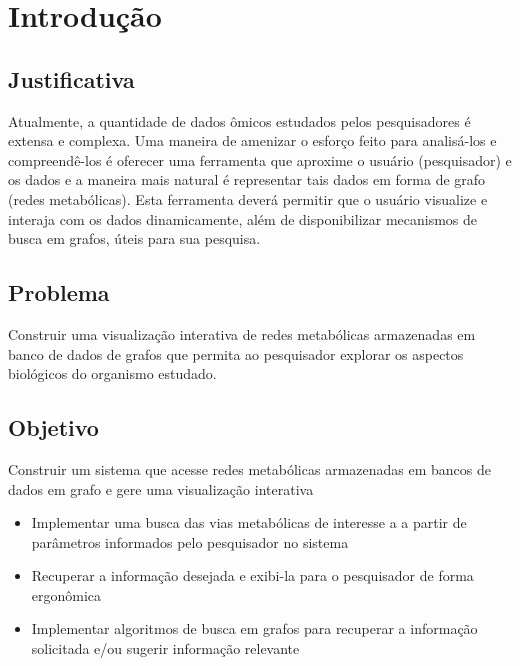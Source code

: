 \chapter{Introdução}





\section{Justificativa}
\indent Atualmente, a quantidade de dados ômicos estudados pelos pesquisadores é extensa e complexa. Uma maneira de amenizar o esforço feito para analisá-los e compreendê-los é oferecer uma ferramenta que aproxime o usuário (pesquisador) e os dados e a maneira mais natural é representar tais dados em forma de grafo (redes metabólicas). Esta ferramenta deverá permitir que o usuário visualize e interaja com os dados dinamicamente, além de disponibilizar mecanismos de busca em grafos, úteis para sua pesquisa.

\section{Problema}
\indent Construir uma visualização interativa de redes metabólicas armazenadas em banco de dados de grafos que permita ao pesquisador explorar os aspectos biológicos do organismo estudado.

\section{Objetivo}
\indent Construir um sistema que acesse redes metabólicas armazenadas em bancos de dados em grafo e gere uma visualização interativa
\begin{itemize}
 \item Implementar uma busca das vias metabólicas de interesse a a partir de parâmetros informados pelo pesquisador no sistema
 \item Recuperar a informação desejada e exibi-la para o pesquisador de forma ergonômica
 \item Implementar algoritmos de busca em grafos para recuperar a informação solicitada e/ou sugerir informação relevante
\end{itemize}

